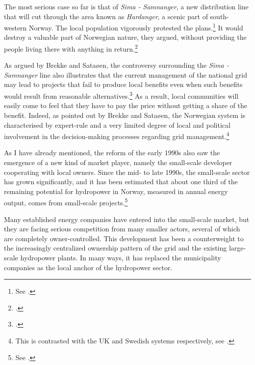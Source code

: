 The most serious case so far is that of {\it Sima - Samnanger}, a new distribution line that will cut through the area known as {\it Hardanger}, a scenic part of south-western Norway. The local population vigorously protested the plans.\footnote{See \cite[22-23]{brekke12}.} It would destroy a valuable part of Norwegian nature, they argued, without providing the people living there with anything in return.\footcite[26-27]{brekke12} %

As argued by Brekke and Sataøen, the controversy surrounding the {\it Sima - Samnanger} line also illustrates that the current management of the national grid may lead to projects that fail to produce local benefits even when such benefits would result from reasonable alternatives.\footcite[27]{brekke12} As a result, local communities will easily come to feel that they have to pay the price without getting a share of the benefit. Indeed, as pointed out by Brekke and Sataøen, the Norwegian system is characterised by expert-rule and a very limited degree of local and political involvement in the decision-making processes regarding grid management.\footnote{This is contrasted with the UK and Swedish systems respectively, see \cite[26]{brekke12}.}

As I have already mentioned, the reform of the early 1990s also saw the emergence of a new kind of market player, namely the small-scale developer cooperating with local owners. Since the mid- to late 1990s, the small-scale sector has grown significantly, and it has been estimated that about one third of the remaining potential for hydropower in Norway, measured in annual energy output, comes from small-scale projects.\footnote{See \cite[231]{nou129}.} 

Many established energy companies have entered into the small-scale market, but they are facing serious competition from many smaller actors, several of which are completely owner-controlled. This development has been a counterweight to the increasingly centralized ownership pattern of the grid and the existing large-scale hydropower plants. In many ways, it has replaced the municipality companies as the local anchor of the hydropower sector. 


